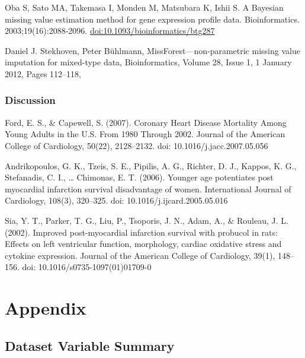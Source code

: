 \documentclass[
]{article}
\begin{document}
Oba S, Sato MA, Takemasa I, Monden M, Matsubara K, Ishii S. A Bayesian
missing value estimation method for gene expression profile data.
Bioinformatics. 2003;19(16):2088‐2096.
\url{doi:10.1093/bioinformatics/btg287}

Daniel J. Stekhoven, Peter Bühlmann, MissForest---non-parametric missing
value imputation for mixed-type data, Bioinformatics, Volume 28, Issue
1, 1 January 2012, Pages 112--118,

\hypertarget{discussion-1}{%
\subsubsection{Discussion}\label{discussion-1}}

Ford, E. S., \& Capewell, S. (2007). Coronary Heart Disease Mortality
Among Young Adults in the U.S. From 1980 Through 2002. Journal of the
American College of Cardiology, 50(22), 2128--2132. doi:
10.1016/j.jacc.2007.05.056

Andrikopoulos, G. K., Tzeis, S. E., Pipilis, A. G., Richter, D. J.,
Kappos, K. G., Stefanadis, C. I., \ldots{} Chimonas, E. T. (2006).
Younger age potentiates post myocardial infarction survival disadvantage
of women. International Journal of Cardiology, 108(3), 320--325. doi:
10.1016/j.ijcard.2005.05.016

Sia, Y. T., Parker, T. G., Liu, P., Tsoporis, J. N., Adam, A., \&
Rouleau, J. L. (2002). Improved post-myocardial infarction survival with
probucol in rats: Effects on left ventricular function, morphology,
cardiac oxidative stress and cytokine expression. Journal of the
American College of Cardiology, 39(1), 148--156. doi:
10.1016/s0735-1097(01)01709-0

\newpage

\hypertarget{appendix}{%
\section{Appendix}\label{appendix}}

\hypertarget{dataset-variable-summary}{%
\subsection{Dataset Variable Summary}\label{dataset-variable-summary}}
\end{document}
